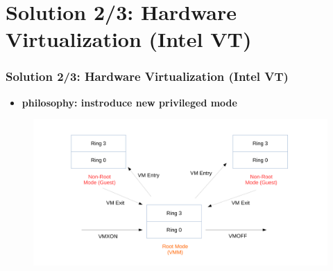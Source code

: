 \documentclass[aspectratio=169]{beamer}
\begin{document}

\section{Solution 2/3: Hardware Virtualization (Intel VT)}
\begin{frame}
\frametitle{Solution 2/3: Hardware Virtualization (Intel VT)}
\begin{itemize}
\item \textbf{philosophy: instroduce new privileged mode}
\end{itemize}
\begin{figure}
\includegraphics[width=0.9\linewidth]{figures/vmx.pdf}
\end{figure}
\end{frame}

\end{document}
